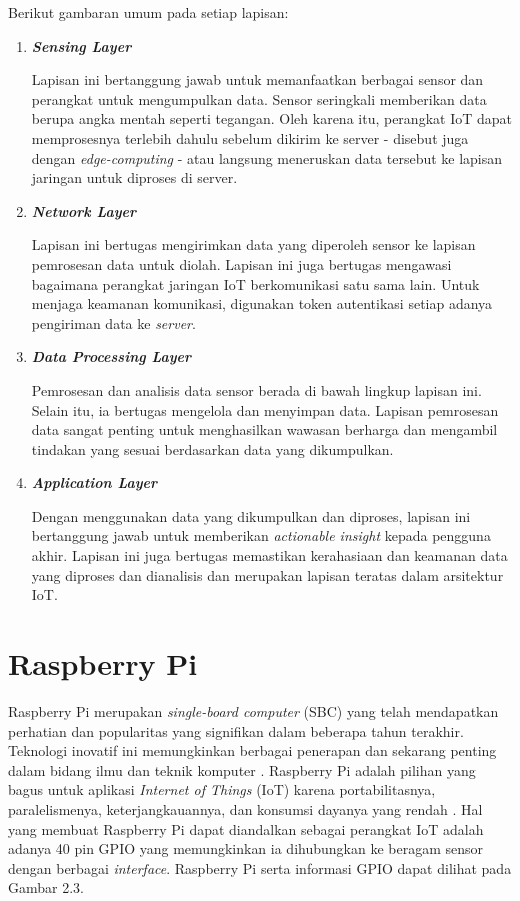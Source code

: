 Berikut gambaran umum pada setiap lapisan:
\begin{enumerate}
    \item \textbf{\textit{Sensing Layer}}

    Lapisan ini bertanggung jawab untuk memanfaatkan berbagai sensor dan perangkat untuk mengumpulkan data. Sensor seringkali memberikan data berupa angka mentah seperti tegangan. Oleh karena itu, perangkat IoT dapat memprosesnya terlebih dahulu sebelum dikirim ke server - disebut juga dengan \textit{edge-computing} - atau langsung meneruskan data tersebut ke lapisan jaringan untuk diproses di server.


    \item \textbf{\textit{Network Layer}}

    Lapisan ini bertugas mengirimkan data yang diperoleh sensor ke lapisan pemrosesan data untuk diolah. Lapisan ini juga bertugas mengawasi bagaimana perangkat jaringan IoT berkomunikasi satu sama lain. Untuk menjaga keamanan komunikasi, digunakan token autentikasi setiap adanya pengiriman data ke \textit{server}.

    \item \textbf{\textit{Data Processing Layer}}

    Pemrosesan dan analisis data sensor berada di bawah lingkup lapisan ini. Selain itu, ia bertugas mengelola dan menyimpan data. Lapisan pemrosesan data sangat penting untuk menghasilkan wawasan berharga dan mengambil tindakan yang sesuai berdasarkan data yang dikumpulkan.

    \item \textbf{\textit{Application Layer}}

    Dengan menggunakan data yang dikumpulkan dan diproses, lapisan ini bertanggung jawab untuk memberikan \textit{actionable insight} kepada pengguna akhir. Lapisan ini juga bertugas memastikan kerahasiaan dan keamanan data yang diproses dan dianalisis dan merupakan lapisan teratas dalam arsitektur IoT.

\end{enumerate}

\section{Raspberry Pi}
Raspberry Pi merupakan \textit{single-board computer} (SBC) yang telah mendapatkan perhatian dan popularitas yang signifikan dalam beberapa tahun terakhir. Teknologi inovatif ini memungkinkan berbagai penerapan dan sekarang penting dalam bidang ilmu dan teknik komputer \parencite{article:johnston}. Raspberry Pi adalah pilihan yang bagus untuk aplikasi \textit{Internet of Things} (IoT) karena portabilitasnya, paralelismenya, keterjangkauannya, dan konsumsi dayanya yang rendah \parencite{article:hosny}. Hal yang membuat Raspberry Pi dapat diandalkan sebagai perangkat IoT adalah adanya 40 pin GPIO yang memungkinkan ia dihubungkan ke beragam sensor dengan berbagai \textit{interface}. Raspberry Pi serta informasi GPIO dapat dilihat pada Gambar 2.3.


